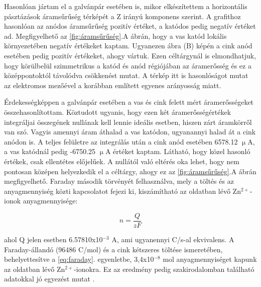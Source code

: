 Hasonlóan jártam el a galvánpár esetében is, mikor elkészítettem a horizontális pásztázások áramsűrűség térképét a Z irányú komponens szerint. A grafithoz hasonlóan az anódos áramsűrűség pozitív értéket, a katódos pedig negatív értéket ad. Megfigyelhető az \ref{fig:áramsűrűség}.A ábrán, hogy a vas katód lokális környezetében negatív értékeket kaptam. Ugyanezen ábra (B) képén a cink anód esetében pedig pozitív értékeket, ahogy vártuk. Ezen céltárgynál is elmondhatjuk, hogy körülbelül szimmetrikus a katód és anód régiójában az áramerősség és ez a középpontoktól távolódva csökkenést mutat. A térkép itt is hasonlóságot mutat az elektromos mezőével a korábban említett egyenes arányosság miatt. 

Érdekességképpen a galvánpár esetében a vas és cink felett mért áramerősségeket összehasonlítottam. Köztudott ugyanis, hogy ezen két áramerősségértékek integráljai összegének nullának kell lennie ideális esetben, hiszen zárt áramkörről van szó. Vagyis amennyi áram áthalad a vas katódon, ugyanannyi halad át a cink anódon is. A teljes felületre az integrálás után a cink anód esetében 6578.12 $\upmu$A, a vas katódnál pedig -6750.25 $\upmu$A értéket kaptam. Látható, hogy közel hasonló értékek, csak ellentétes előjelűek. A nullától való eltérés oka lehet, hogy nem pontosan középen helyezkedik el a céltárgy, ahogy ez az \ref{fig:áramsűrűség}.A ábrán megfigyelhető. Faraday második törvényét felhasználva, mely a töltés és az anyagmennyiség közti kapcsolatot fejezi ki, kiszámítható az oldatban lévő Zn$^{2+}$-ionok anyagmennyisége:

\begin{equation}
{n}= \frac{Q}{zF}
\label{eq:faraday}
\end{equation}

ahol Q jelen esetben 6.57810x10$^{-3}$ A, ami ugyanennyi C/s-al ekvivalens. A Faraday-állandó (96486 C/mol) és a cink kétszeres töltése ismeretében, behelyettesítve a \ref{eq:faraday}. egyenletbe, 3,4x10$^{-8}$ mol anyagmennyiséget kapunk az oldatban lévő Zn$^{2+}$-ionokra. Ez az eredmény pedig szakirodalomban található adatokkal jó egyezést mutat \cite{kiss2013investigation}.


